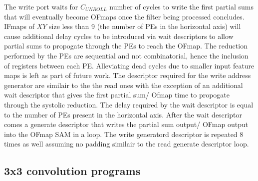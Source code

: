 The write port waits for $C_{UNROLL}$ number of cycles to write the first
partial sums that will eventually become OFmaps once the filter being processed
concludes. IFmaps of $XY$ size less than 9 (the number of PEs in the horizontal
axis) will cause additional delay cycles to be introduced via wait descriptors
to allow partial sums to propogate through the PEs to reach the OFmap. The
reduction performed by the PEs are sequential and not combinatorial, hence the
inclusion of registers between each PE. Alleviating dead cycles due to smaller
input feature maps is left as part of future work. The descriptor required for
the write address generator are similair to the the read ones with the exception
of an additional wait descriptor that gives the first partial sum/ Ofmap time to
propogate through the systolic reduction. The delay required by the wait
descriptor is equal to the number of PEs present in the horizontal axis. After
the wait descriptor comes a generate descriptor that writes the partial sum
output/ OFmap output into the OFmap SAM in a loop. The write generatord
descriptor is repeated 8 times as well assuming no padding similair to
the read generate descriptor loop.

\subsection{3x3 convolution programs}
\label{chap:sams:acc_scheduling:3x3}